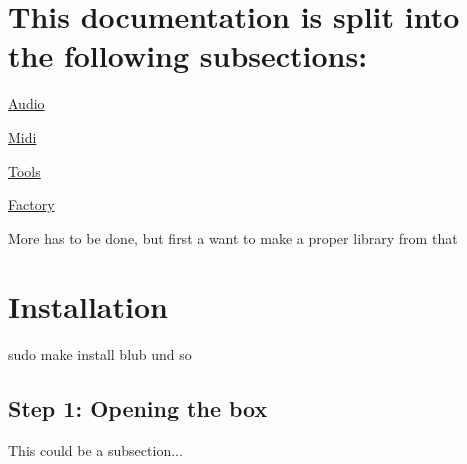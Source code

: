\hypertarget{index_intro_sec}{}\section{This documentation is split into the following subsections\-:}\label{index_intro_sec}
\hyperlink{group__Audio}{Audio}\par
\hyperlink{group__Midi}{Midi}\par
\hyperlink{group__Tools}{Tools}\par
\hyperlink{group__Factory}{Factory}\par
\par
More has to be done, but first a want to make a proper library from that\hypertarget{index_install_sec}{}\section{Installation}\label{index_install_sec}
sudo make install blub und so\hypertarget{index_step1}{}\subsection{Step 1\-: Opening the box}\label{index_step1}
This could be a subsection... 